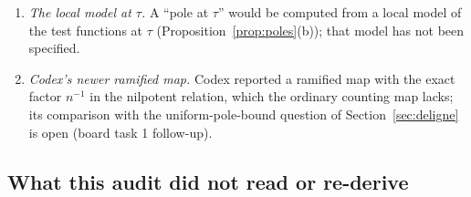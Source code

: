 \begin{enumerate}[label=\arabic*.]
\item \emph{The local model at $\tau$.} A ``pole at $\tau$'' would be computed from a local model of the test functions at $\tau$ (Proposition~\ref{prop:poles}(b)); that model has not been specified.
\item \emph{Codex's newer ramified map.} Codex reported a ramified map with the exact factor $n^{-1}$ in the nilpotent relation, which the ordinary counting map lacks; its comparison with the uniform-pole-bound question of Section~\ref{sec:deligne} is open (board task 1 follow-up).
\end{enumerate}

\subsection{What this audit did not read or re-derive}

